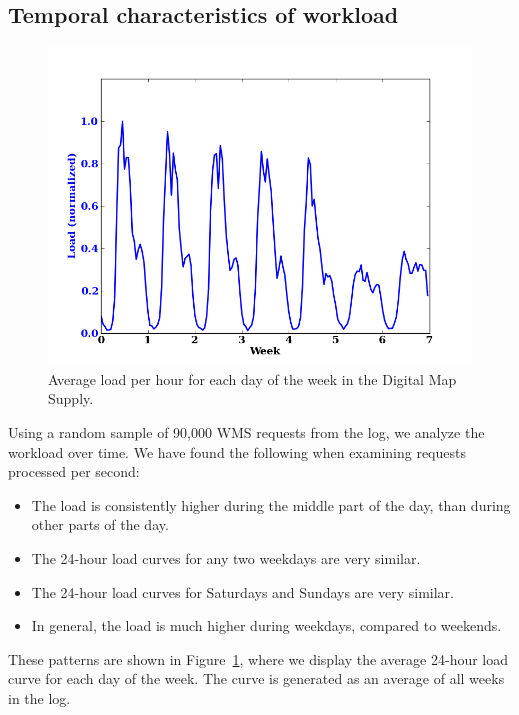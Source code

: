 \documentclass[11pt, oneside]{report}
\begin{document}
{\subsection{Temporal characteristics of workload}
\label{sec:temporal:characteristics}

\begin{figure}
\centering
\includegraphics[scale=0.5]{figs-tileheat/average_load_week.png}
\caption{Average load per hour for each day of the week in the Digital Map Supply.}
\label{fig:weekload}
\end{figure}

Using a random sample of 90,000 WMS requests from the log, we analyze the workload over time. We have found the following when examining requests processed per second:

\begin{itemize}
\item The load is consistently higher during the middle part of the day, than during other parts of the day.
\item The 24-hour load curves for any two weekdays are very similar.
\item The 24-hour load curves for Saturdays and Sundays are very similar.
\item In general, the load is much higher during weekdays, compared to weekends.
\end{itemize}

These patterns are shown in Figure~\ref{fig:weekload}, where we display the average 24-hour load curve for each day of the week. The curve is generated as an average of all weeks in the log.

}
\end{document}
